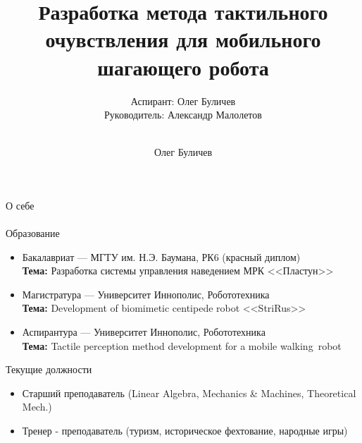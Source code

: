 \documentclass[aspectratio=169,xcolor=table]{beamer}
\title[]{Разработка метода тактильного очувствления для мобильного шагающего робота} %
\subtitle{Аспирант: Олег Буличев \\ Руководитель: Александр Малолетов \\ \ } %
\author{Олег Буличев}
\newcommand{\fbckg}[1]{\usebackgroundtemplate{\texttt{[image: \#1]}}}%
\begin{document}
\setlength{\abovedisplayskip}{0pt}
\setlength{\belowdisplayskip}{0pt}
\setlength{\abovedisplayshortskip}{0pt}
\setlength{\belowdisplayshortskip}{0pt}

\fbckg{fibeamer/figs/title_page.png}

\fbckg{fibeamer/figs/common.png}

\begin{frame}[t]{О себе}
\framesubtitle{}
\vspace{-0.2cm}
    \begin{exampleblock}{Образование}
        \vspace{-0.2cm}
        \begin{itemize}
            \item Бакалавриат --- МГТУ им. Н.Э. Баумана, РК6 (красный диплом) \\ \textbf{Тема:} Разработка системы управления наведением МРК <<Пластун>>
            \item Магистратура --- Университет Иннополис, Робототехника \\ \textbf{Тема:} Development of biomimetic centipede robot <<StriRus>>
            \item Аспирантура --- Университет Иннополис, Робототехника \\ \textbf{Тема:} Tactile perception method development for a mobile walking~robot
        \end{itemize}
    \end{exampleblock}
    \begin{alertblock}{Текущие должности}
        \vspace{-0.2cm}
        \begin{itemize}
        \item Старший преподаватель (Linear Algebra, Mechanics \& Machines, Theoretical Mech.)
        \item Тренер - преподаватель (туризм, историческое фехтование, народные игры)
    \end{itemize}
    \end{alertblock}
\end{frame}
\end{document}
